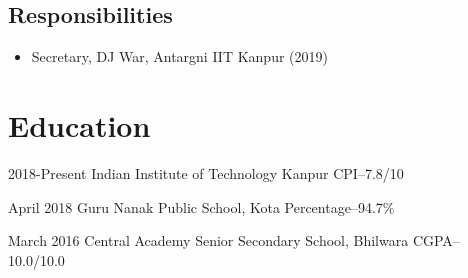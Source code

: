 \documentclass[]{style}          %
\begin{document}
\begin{aside}
\begin{flushleft}
\section{Responsibilities}
  {\vspace{-0.2cm}}

\begin{entrylist}
{\vspace{-1.1cm}}
\entry
  {}
  {\begin{itemize}[leftmargin=*]
      \item Secretary,
      DJ War,
      Antargni IIT Kanpur
      (2019)
      {\vspace{+0.12cm}}
      
  \end{itemize}}
  {}
  {}



\end{entrylist}
\end{flushleft}
\end{aside}



\section{Education}

\begin{entrylist}
\entry
{2018-Present}
{Indian Institute of Technology Kanpur}
{CPI--7.8/10}

\entry
{April 2018}
{Guru Nanak Public School, Kota}
{Percentage--94.7\%}

\entry
{March 2016}
{Central Academy Senior Secondary School, Bhilwara}
{CGPA--10.0/10.0}
{\vspace{-0.3cm}}

\end{entrylist}
\end{document}
